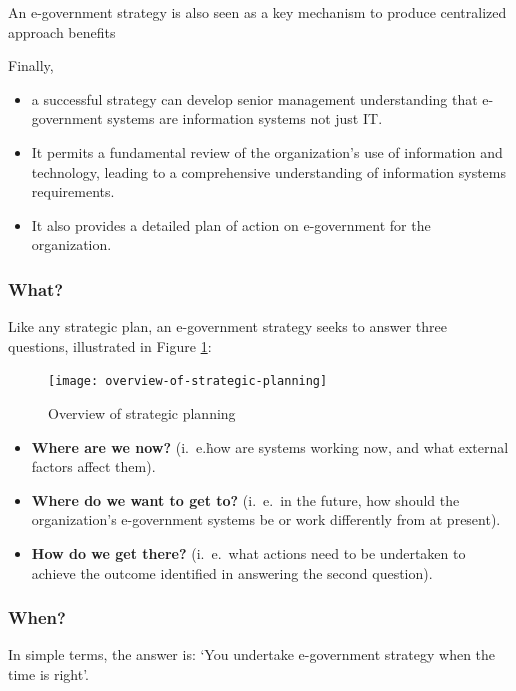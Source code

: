 An e-government strategy is also seen as
a key mechanism to produce centralized approach benefits


Finally, 
\begin{itemize}
	\item a successful strategy can develop
	senior management understanding that
	e-government systems are information
	systems not just IT.
	
	\item It permits a fundamental
	review of the organization’s use of information and technology, leading to a comprehensive understanding of information
	systems requirements. 
	
	\item It also provides a detailed plan of action on e-government for 	the organization.
\end{itemize}



\subsubsection*{What?}
Like any strategic plan, an e-government
strategy seeks to answer three questions,
illustrated in Figure \ref{fig:overview-of-strategic-planning}:
\begin{figure}[tph]
	\centering
	\texttt{[image: overview-of-strategic-planning]}
	\caption{Overview of strategic planning}
	\label{fig:overview-of-strategic-planning}
\end{figure}

\begin{itemize}
	\item \textbf{Where are we now?} (i.\ e.\. how are systems working now, and what external factors affect them).
	
	\item \textbf{Where do we want to get to?} (i.\ e.\ in the future, how should the organization’s e-government systems be or work differently from at present).
	
	\item \textbf{How do we get there? }(i.\ e.\ what actions need to be undertaken to achieve the	outcome identified in answering the second question).
\end{itemize}


\subsubsection*{When?}
In simple terms, the answer is: ‘You undertake e-government strategy when the time
is right’.

